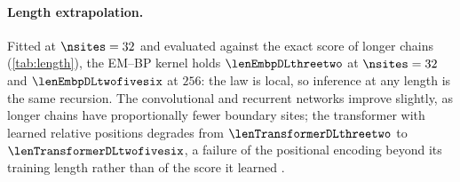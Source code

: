 \paragraph{Length extrapolation.}
Fitted at $\nsites=32$ and evaluated against the exact score of longer chains
(\cref{tab:length}), the EM--BP kernel holds $\lenEmbpDLthreetwo$ at $\nsites=32$ and
$\lenEmbpDLtwofivesix$ at $256$: the law is local, so inference at any length is the same
recursion. The convolutional and recurrent networks improve slightly, as longer chains
have proportionally fewer boundary sites; the transformer with learned relative positions
degrades from $\lenTransformerDLthreetwo$ to $\lenTransformerDLtwofivesix$, a failure of
the positional encoding beyond its training length rather than of the score it learned
\citep{press2022alibi,kazemnejad2023positional}.
